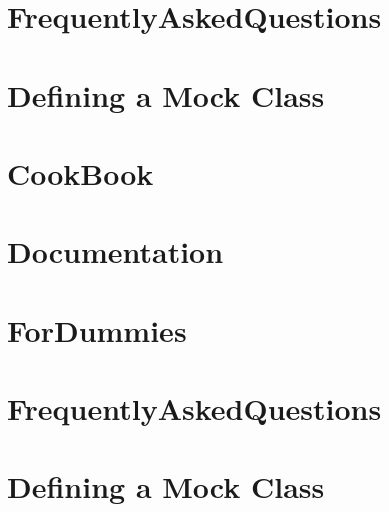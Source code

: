\documentclass[twoside]{book}
\newcommand{\+}{\discretionary{\mbox{\scriptsize$\hookleftarrow$}}{}{}}
\begin{document}
\chapter{Frequently\+Asked\+Questions}
\label{md_vendor_googletest_googlemock_docs_v1_5__frequently_asked_questions}

\chapter{Defining a Mock Class}
\label{md_vendor_googletest_googlemock_docs_v1_6__cheat_sheet}

\chapter{Cook\+Book}
\label{md_vendor_googletest_googlemock_docs_v1_6__cook_book}

\chapter{Documentation}
\label{md_vendor_googletest_googlemock_docs_v1_6__documentation}

\chapter{For\+Dummies}
\label{md_vendor_googletest_googlemock_docs_v1_6__for_dummies}

\chapter{Frequently\+Asked\+Questions}
\label{md_vendor_googletest_googlemock_docs_v1_6__frequently_asked_questions}

\chapter{Defining a Mock Class}
\label{md_vendor_googletest_googlemock_docs_v1_7__cheat_sheet}

\end{document}
